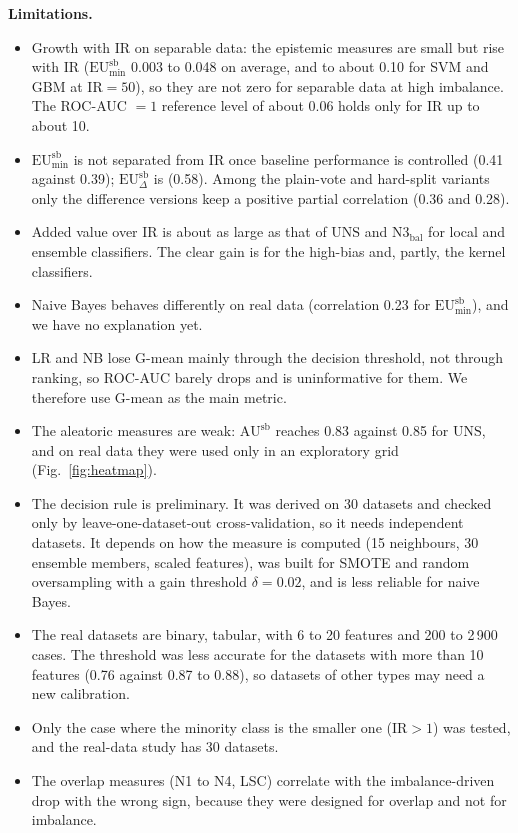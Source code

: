 \documentclass[preprint,12pt]{elsarticle}
\newcommand{\EUmin}[1]{\mathrm{EU}^{\mathrm{#1}}_{\min}}
\newcommand{\EUdif}[1]{\mathrm{EU}^{\mathrm{#1}}_{\Delta}}
\newcommand{\AUbal}[1]{\mathrm{AU}^{\mathrm{#1}}}
\newcommand{\IR}{\mathrm{IR}}
\newcommand{\UNS}{\mathrm{UNS}}
\newcommand{\Nbal}{\mathrm{N3}_{\mathrm{bal}}}
\begin{document}
\textbf{Limitations.}
\begin{itemize}
\item Growth with $\IR$ on separable data: the epistemic measures are small but rise with $\IR$ ($\EUmin{sb}$ 0.003 to 0.048 on average, and to about 0.10 for SVM and GBM at $\IR=50$), so they are not zero for separable data at high imbalance. The ROC-AUC $=1$ reference level of about 0.06 holds only for $\IR$ up to about 10.
\item $\EUmin{sb}$ is not separated from $\IR$ once baseline performance is controlled (0.41 against 0.39); $\EUdif{sb}$ is (0.58). Among the plain-vote and hard-split variants only the difference versions keep a positive partial correlation (0.36 and 0.28).
\item Added value over $\IR$ is about as large as that of $\UNS$ and $\Nbal$ for local and ensemble classifiers. The clear gain is for the high-bias and, partly, the kernel classifiers.
\item Naive Bayes behaves differently on real data (correlation 0.23 for $\EUmin{sb}$), and we have no explanation yet.
\item LR and NB lose G-mean mainly through the decision threshold, not through ranking, so ROC-AUC barely drops and is uninformative for them. We therefore use G-mean as the main metric.
\item The aleatoric measures are weak: $\AUbal{sb}$ reaches 0.83 against 0.85 for $\UNS$, and on real data they were used only in an exploratory grid (Fig.~\ref{fig:heatmap}).
\item The decision rule is preliminary. It was derived on 30 datasets and checked only by leave-one-dataset-out cross-validation, so it needs independent datasets. It depends on how the measure is computed (15 neighbours, 30 ensemble members, scaled features), was built for SMOTE and random oversampling with a gain threshold $\delta=0.02$, and is less reliable for naive Bayes.
\item The real datasets are binary, tabular, with 6 to 20 features and 200 to 2\,900 cases. The threshold was less accurate for the datasets with more than 10 features (0.76 against 0.87 to 0.88), so datasets of other types may need a new calibration.
\item Only the case where the minority class is the smaller one ($\IR>1$) was tested, and the real-data study has 30 datasets.
\item The overlap measures (N1 to N4, LSC) correlate with the imbalance-driven drop with the wrong sign, because they were designed for overlap and not for imbalance.
\end{itemize}
\end{document}
